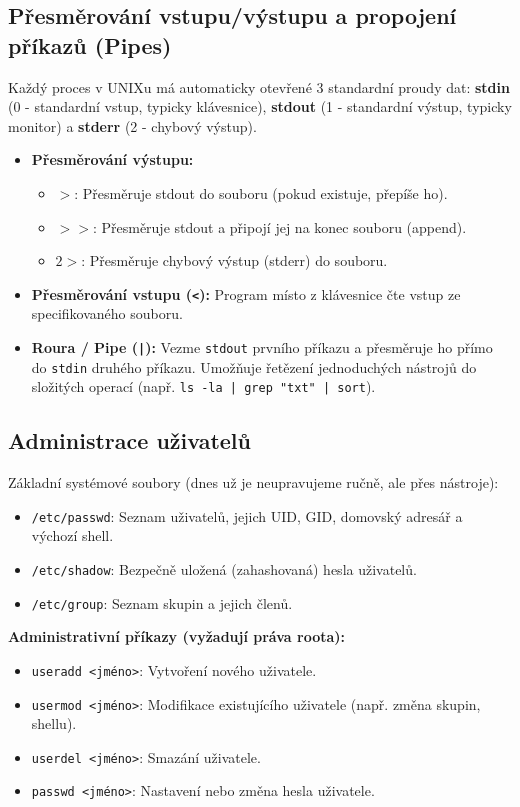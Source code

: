 \subsection{Přesměrování vstupu/výstupu a propojení příkazů (Pipes)}
Každý proces v UNIXu má automaticky otevřené 3 standardní proudy dat: \textbf{stdin} (0 - standardní vstup, typicky klávesnice), \textbf{stdout} (1 - standardní výstup, typicky monitor) a \textbf{stderr} (2 - chybový výstup).
\begin{itemize}
    \item \textbf{Přesměrování výstupu:} 
    \begin{itemize}
        \item \texttt{$>$}: Přesměruje stdout do souboru (pokud existuje, přepíše ho).
        \item \texttt{$>>$}: Přesměruje stdout a připojí jej na konec souboru (append).
        \item \texttt{$2>$}: Přesměruje chybový výstup (stderr) do souboru.
    \end{itemize}
    \item \textbf{Přesměrování vstupu (\texttt{<}):} Program místo z klávesnice čte vstup ze specifikovaného souboru.
    \item \textbf{Roura / Pipe (\texttt{|}):} Vezme \texttt{stdout} prvního příkazu a přesměruje ho přímo do \texttt{stdin} druhého příkazu. Umožňuje řetězení jednoduchých nástrojů do složitých operací (např. \texttt{ls -la | grep "txt" | sort}).
\end{itemize}

\subsection{Administrace uživatelů}
Základní systémové soubory (dnes už je neupravujeme ručně, ale přes nástroje):
\begin{itemize}
    \item \texttt{/etc/passwd}: Seznam uživatelů, jejich UID, GID, domovský adresář a výchozí shell.
    \item \texttt{/etc/shadow}: Bezpečně uložená (zahashovaná) hesla uživatelů.
    \item \texttt{/etc/group}: Seznam skupin a jejich členů.
\end{itemize}
\textbf{Administrativní příkazy (vyžadují práva roota):}
\begin{itemize}
    \item \texttt{useradd <jméno>}: Vytvoření nového uživatele.
    \item \texttt{usermod <jméno>}: Modifikace existujícího uživatele (např. změna skupin, shellu).
    \item \texttt{userdel <jméno>}: Smazání uživatele.
    \item \texttt{passwd <jméno>}: Nastavení nebo změna hesla uživatele.
\end{itemize}

